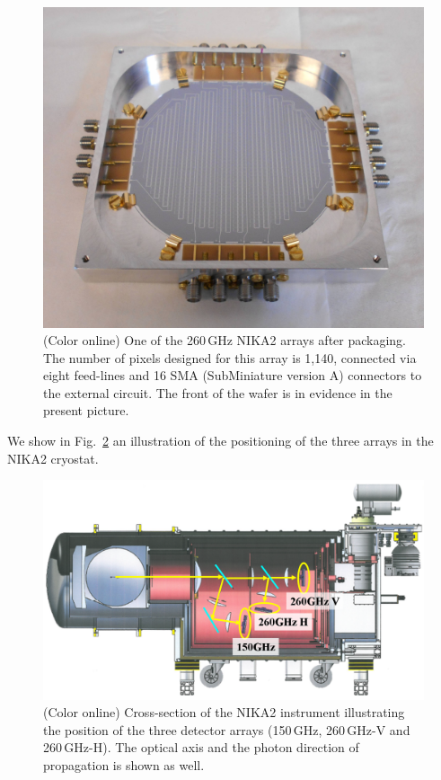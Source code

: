 \documentclass[]{aa} %
\begin{document}
\begin{figure}[h]
   \centering
    \includegraphics[width=.95\linewidth]{1mm_array.jpg}
      \caption{(Color online) One of the 260\,GHz NIKA2 arrays after packaging. The number of pixels designed for this array is 1,140, connected via eight feed-lines and 16 SMA (SubMiniature version A) connectors to the external circuit. The front of the wafer is in evidence in the present picture.}
         \label{Array}
\end{figure}

We show in Fig.~\ref{Cryostat} an illustration of the positioning of the three arrays in the NIKA2 cryostat.
 
\begin{figure}[h]
   \centering
   \includegraphics[width=.95\linewidth]{Fig1_cryo.png}
      \caption{(Color online) Cross-section of the NIKA2 instrument illustrating the position of the three detector arrays (150\,GHz, 260\,GHz-V and 260\,GHz-H). The optical axis and the photon direction of propagation is shown as well.}
         \label{Cryostat}
\end{figure}
\end{document}
